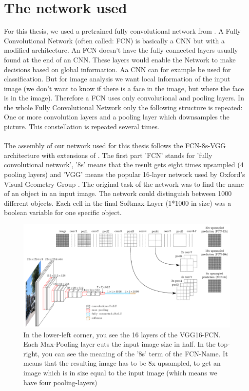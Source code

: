 \section{The network used}
\label{sec:theFCN}
For this thesis, we used a pretrained fully convolutional network from \cite{nirkin2018_faceswap}. A Fully Convolutional Network (often called: FCN) is basically a CNN but with a modified architecture. An FCN doesn't have the fully connected layers usually found at the end of an CNN. These layers would enable the Network to make decisions based on global information. Aa CNN can for example be used for classification. But for image analysis we want local information of the input image (we don't want to know if there is a face in the image, but where the face is in the image). Therefore a FCN uses only convolutional and pooling layers. In the whole Fully Convolutional Network only the following structure is repeated: One or more convolution layers and a pooling layer which downsamples the picture. This constellation is repeated several times.\\
\\
The assembly of our network used for this thesis follows the FCN-8s-VGG architecture with extensions of \cite{jlong}. The first part 'FCN' stands for 'fully convolutional network', '8s' means that the result gets eight times upsampled (4 pooling layers) and 'VGG' means the popular 16-layer network used by Oxford's Visual Geometry Group \cite{ksimonyan}. The original task of the network was to find the name of an object in an input image. The network could distinguish between 1000 different objects. Each cell in the final Softmax-Layer (1*1000 in size) was a boolean variable for one specific object.

\begin{figure}
	\centering
	\includegraphics[width=1\linewidth]{Figures/fcn_1.png}
	\caption{In the lower-left corner, you see the 16 layers of the VGG16-FCN. Each Max-Pooling layer cuts the input image size in half. In the top-right, you can see the meaning of the '8s' term of the FCN-Name. It means that the resulting image has to be 8x upsampled, to get an image which is in size equal to the input image (which means we have four pooling-layers)}
	\label{fig:test1}
\end{figure}


